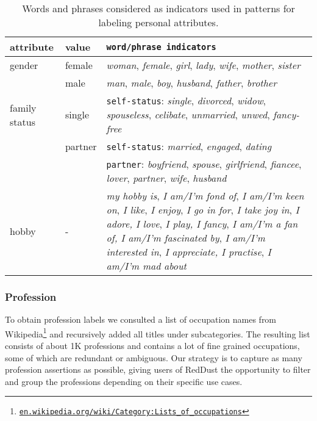 \begin{table*}
\centering
\begin{adjustbox}{width=0.88\textwidth}
\begin{tabularx}{\linewidth}{llX}
\toprule
\textbf{attribute} & \textbf{value} & \texttt{\footnotesize word/phrase indicators} \\
\midrule
gender & female & \textit{woman}, \textit{female}, \textit{girl}, \textit{lady}, \textit{wife}, \textit{mother}, \textit{sister} \\
 & male & \textit{man}, \textit{male}, \textit{boy}, \textit{husband}, \textit{father}, \textit{brother}
 \\ [1.0ex]
family status & single & \texttt{\footnotesize self-status}: \textit{single}, \textit{divorced}, \textit{widow}, \textit{spouseless}, \textit{celibate}, \textit{unmarried},  \textit{unwed},  \textit{fancy-free} \\
 & partner & \texttt{\footnotesize self-status}: \textit{married}, \textit{engaged}, \textit{dating} \\
 & & \texttt{\footnotesize partner}: \textit{boyfriend}, \textit{spouse}, \textit{girlfriend}, \textit{fiancee}, \textit{lover}, \textit{partner}, \textit{wife}, \textit{husband}
  \\ [1.0ex]
hobby & - & \textit{my hobby is}, \textit{I am/I'm fond of}, \textit{I am/I'm keen on}, \textit{I like}, \textit{I enjoy}, \textit{I go in for}, \textit{I take joy in}, \textit{I adore,} \textit{I love}, \textit{I play, I fancy}, \textit{I am/I'm a fan of, I am/I'm fascinated by}, \textit{I am/I'm interested in}, \textit{I appreciate, I practise}, \textit{I am/I'm mad about} \\
\bottomrule
\end{tabularx}
\end{adjustbox}
\caption{Words and phrases considered as indicators used in patterns for labeling personal attributes.}
\label{word_table}
\end{table*}

\subsubsection{Profession}
To obtain profession labels we consulted a list of occupation names from Wikipedia\footnote{ \href{https://en.wikipedia.org/wiki/Category:Lists_of_occupations}{\texttt{en.wikipedia.org/wiki/Category:Lists\_of\_occupations}}} and recursively added all titles under subcategories. The resulting list consists of about 1K professions and contains a lot of fine grained occupations, some of which are redundant or ambiguous. Our strategy is to capture as many profession assertions as possible, giving users of RedDust the opportunity to filter and group the professions depending on their specific use cases.

